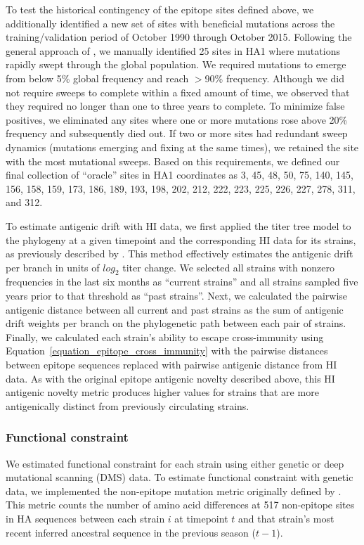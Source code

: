 To test the historical contingency of the epitope sites defined above, we additionally identified a new set of sites with beneficial mutations across the training/validation period of October 1990 through October 2015.
Following the general approach of \cite{Shih:2007bd}, we manually identified 25 sites in HA1 where mutations rapidly swept through the global population.
We required mutations to emerge from below 5\% global frequency and reach $>$90\% frequency.
Although we did not require sweeps to complete within a fixed amount of time, we observed that they required no longer than one to three years to complete.
To minimize false positives, we eliminated any sites where one or more mutations rose above 20\% frequency and subsequently died out.
If two or more sites had redundant sweep dynamics (mutations emerging and fixing at the same times), we retained the site with the most mutational sweeps.
Based on this requirements, we defined our final collection of ``oracle'' sites in HA1 coordinates as 3, 45, 48, 50, 75, 140, 145, 156, 158, 159, 173, 186, 189, 193, 198, 202, 212, 222, 223, 225, 226, 227, 278, 311, and 312.

To estimate antigenic drift with HI data, we first applied the titer tree model to the phylogeny at a given timepoint and the corresponding HI data for its strains, as previously described by \cite{Neher:2016hy}.
This method effectively estimates the antigenic drift per branch in units of $log_{2}$ titer change.
We selected all strains with nonzero frequencies in the last six months as ``current strains'' and all strains sampled five years prior to that threshold as ``past strains''.
Next, we calculated the pairwise antigenic distance between all current and past strains as the sum of antigenic drift weights per branch on the phylogenetic path between each pair of strains.
Finally, we calculated each strain's ability to escape cross-immunity using Equation~\ref{equation_epitope_cross_immunity} with the pairwise distances between epitope sequences replaced with pairwise antigenic distance from HI data.
As with the original epitope antigenic novelty described above, this HI antigenic novelty metric produces higher values for strains that are more antigenically distinct from previously circulating strains.

\subsubsection*{Functional constraint}

We estimated functional constraint for each strain using either genetic or deep mutational scanning (DMS) data.
To estimate functional constraint with genetic data, we implemented the non-epitope mutation metric originally defined by \cite{Luksza:2014hj}.
This metric counts the number of amino acid differences at 517 non-epitope sites in HA sequences between each strain $i$ at timepoint $t$ and that strain's most recent inferred ancestral sequence in the previous season ($t - 1$).

